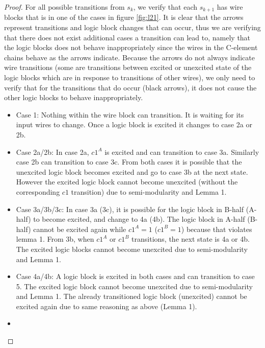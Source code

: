 \documentclass[12pt]{report}
\begin{document}
\begin{proof}
For all possible transitions from $s_k$, we verify that each $s_{k+1}$ has wire blocks that is in one of the cases in figure \ref{fig:l21}.  It is clear that the arrows represent transitions and logic block changes that can occur, thus we are verifying that there does not exist additional cases a transition can lead to, namely that the logic blocks does not behave inappropriately since the wires in the C-element chains behave as the arrows indicate.  Because the arrows do not always indicate wire transitions (some are transitions between excited or unexcited state of the logic blocks which are in response to transitions of other wires), we only need to verify that for the transitions that do occur (black arrows), it does not cause the other logic blocks to behave inappropriately.
\begin{itemize}
\item
Case 1:  Nothing within the wire block can transition.  It is waiting for its input wires to change.  Once a logic block is excited it changes to case 2a or 2b. %
\item
Case 2a/2b:  In case 2a, $c1^A$ is excited and can transition to case 3a.  Similarly case 2b can transition to case 3c.  From both cases it is possible that the unexcited logic block becomes excited and go to case 3b at the next state.  However the excited logic block cannot become unexcited (without the corresponding $c1$ transition) due to semi-modularity and Lemma 1.
\item
Case 3a/3b/3c:  In case 3a (3c), it is possible for the logic block in B-half (A-half) to become excited, and change to 4a (4b).  The logic block in A-half (B-half) cannot be excited again while $c1^A=1$ ($c1^B=1$) because that violates lemma 1.  From 3b, when $c1^A$ or $c1^B$ transitions, the next state is 4a or 4b.  The excited logic blocks cannot become unexcited due to semi-modularity and Lemma 1.
\item
Case 4a/4b:
A logic block is excited in both cases and can transition to case 5.  The excited logic block cannot become unexcited due to semi-modularity and Lemma 1.  The already transitioned logic block (unexcited) cannot be excited again due to same reasoning as above (Lemma 1).
\item

\end{itemize}
\end{proof}
\end{document}
